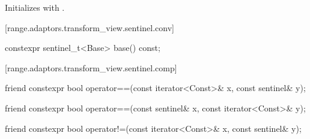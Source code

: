 \begin{itemdescr}
\pnum
\effects Initializes  with .
\end{itemdescr}

[range.adaptors.transform_view.sentinel.conv]{}

\begin{itemdecl}
constexpr sentinel_t<Base> base() const;
\end{itemdecl}

\begin{itemdescr}
\pnum
\oldtxt{\returns}  
\end{itemdescr}

[range.adaptors.transform_view.sentinel.comp]{}

\begin{itemdecl}
friend constexpr bool operator==(const iterator<Const>& x, const sentinel& y);
\end{itemdecl}

\begin{itemdescr}
\pnum
\oldtxt{\returns} 
\end{itemdescr}

\begin{itemdecl}
friend constexpr bool operator==(const sentinel& x, const iterator<Const>& y);
\end{itemdecl}

\begin{itemdescr}
\pnum
\oldtxt{\returns} 
\end{itemdescr}

%
\begin{itemdecl}
friend constexpr bool operator!=(const iterator<Const>& x, const sentinel& y);
\end{itemdecl}

\begin{itemdescr}
\pnum
\oldtxt{\returns} 
\end{itemdescr}

